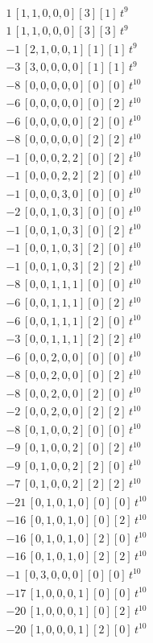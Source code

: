 \begin{align*}
1\,[1,1,0,0,0] [3] [1]\,t^{9} \\
1\,[1,1,0,0,0] [3] [3]\,t^{9} \\
-1\,[2,1,0,0,1] [1] [1]\,t^{9} \\
-3\,[3,0,0,0,0] [1] [1]\,t^{9} \\
-8\,[0,0,0,0,0] [0] [0]\,t^{10} \\
-6\,[0,0,0,0,0] [0] [2]\,t^{10} \\
-6\,[0,0,0,0,0] [2] [0]\,t^{10} \\
-8\,[0,0,0,0,0] [2] [2]\,t^{10} \\
-1\,[0,0,0,2,2] [0] [2]\,t^{10} \\
-1\,[0,0,0,2,2] [2] [0]\,t^{10} \\
-1\,[0,0,0,3,0] [0] [0]\,t^{10} \\
-2\,[0,0,1,0,3] [0] [0]\,t^{10} \\
-1\,[0,0,1,0,3] [0] [2]\,t^{10} \\
-1\,[0,0,1,0,3] [2] [0]\,t^{10} \\
-1\,[0,0,1,0,3] [2] [2]\,t^{10} \\
-8\,[0,0,1,1,1] [0] [0]\,t^{10} \\
-6\,[0,0,1,1,1] [0] [2]\,t^{10} \\
-6\,[0,0,1,1,1] [2] [0]\,t^{10} \\
-3\,[0,0,1,1,1] [2] [2]\,t^{10} \\
-6\,[0,0,2,0,0] [0] [0]\,t^{10} \\
-8\,[0,0,2,0,0] [0] [2]\,t^{10} \\
-8\,[0,0,2,0,0] [2] [0]\,t^{10} \\
-2\,[0,0,2,0,0] [2] [2]\,t^{10} \\
-8\,[0,1,0,0,2] [0] [0]\,t^{10} \\
-9\,[0,1,0,0,2] [0] [2]\,t^{10} \\
-9\,[0,1,0,0,2] [2] [0]\,t^{10} \\
-7\,[0,1,0,0,2] [2] [2]\,t^{10} \\
-21\,[0,1,0,1,0] [0] [0]\,t^{10} \\
-16\,[0,1,0,1,0] [0] [2]\,t^{10} \\
-16\,[0,1,0,1,0] [2] [0]\,t^{10} \\
-16\,[0,1,0,1,0] [2] [2]\,t^{10} \\
-1\,[0,3,0,0,0] [0] [0]\,t^{10} \\
-17\,[1,0,0,0,1] [0] [0]\,t^{10} \\
-20\,[1,0,0,0,1] [0] [2]\,t^{10} \\
-20\,[1,0,0,0,1] [2] [0]\,t^{10} \\

\end{align*}
